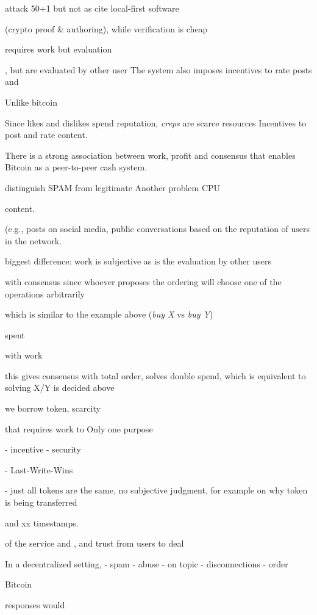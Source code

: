 \documentclass[10pt,journal,compsoc]{IEEEtran}
\begin{document}
attack 50+1 but not as
cite local-first software

 (crypto proof \& authoring),
while verification is cheap


requires work but evaluation


, but
are evaluated by other user
The system also imposes incentives to rate posts and 

Unlike bitcoin

Since likes and dislikes spend reputation, \emph{creps} are scarce resources
Incentives to post and rate content.

There is a strong association between work, profit and consensus that enables
Bitcoin as a peer-to-peer cash system.

distinguish SPAM from legitimate
Another problem CPU



content.



 (e.g., posts on social media, public conversations
based on the reputation of users
in the network.


biggest difference:
work is subjective as is the evaluation by other users


 with consensus since
whoever proposes the ordering will choose one of the operations arbitrarily


 which is similar to the
example above (\emph{buy X} vs \emph{buy Y})

spent

with work



this gives consensus with total order, solves double spend, which is equivalent
to solving X/Y is decided above

we borrow token, scarcity


 that requires work to 
Only one purpose


- incentive
- security

- Last-Write-Wins

- just all tokens are the same, no subjective judgment, for example on why token is being transferred


 and xx timestamps.


 of the service and , and trust from users to deal

In a decentralized setting, 
    - spam
    - abuse
    - on topic
    - disconnections
    - order

Bitcoin

responses would
\end{document}
